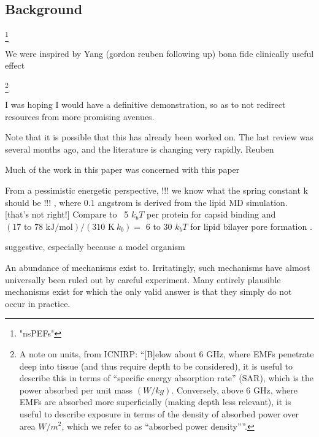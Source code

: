 \documentclass[paper.tex]{subfiles}
\begin{document}
\begin{multicols}{1}

\section{Background}


\footnote{"nsPEFs"}

We were inspired by Yang (gordon reuben following up)
bona fide clinically useful effect

\footnote{A note on units, from ICNIRP: ``{[B]elow about 6 GHz, where EMFs penetrate deep into tissue (and thus require depth to be considered), it is useful to describe this in terms of “specific energy absorption rate” (SAR), which is the power absorbed per unit mass $(W/kg)$. Conversely, above 6 GHz, where EMFs are absorbed more superficially (making depth less relevant), it is useful to describe exposure in terms of the density of absorbed power over area $W/m^2$, which we refer to as “absorbed power density”}''. }


I was hoping I would have a definitive demonstration, so as to not redirect resources from more promising avenues.


Note that it is possible that this has already been worked on. The last review was several months ago, and the literature is changing very rapidly. Reuben

Much of the work in this paper was concerned with this paper



From a pessimistic energetic perspective,  !!! we know what the spring constant k should be !!!
, where 0.1 angstrom is derived from the lipid MD simulation. [that's not right!] Compare to ~5 $k_b T$ per protein for capsid binding \cite{Energies2012} \cite{Weak2002} and $ (\text{17 to 78 kJ/mol})  / (310 \text{ K}\ k_b) = $ 6 to 30 $k_b T$ for lipid bilayer pore formation \cite{Atomistic2014a}.






suggestive, especially because a model organism

An abundance of mechanisms exist to. Irritatingly, such mechanisms have almost universally been ruled out by careful experiment. Many entirely plausible mechanisms exist for which the only valid answer is that they simply do not occur in practice.



\end{multicols}
\end{document}
